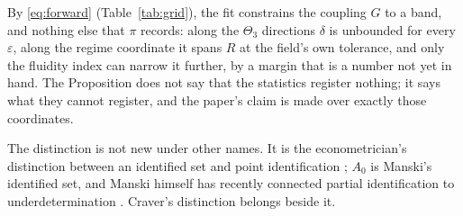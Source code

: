\documentclass[11pt]{article}
\begin{document}
By \eqref{eq:forward} (Table~\ref{tab:grid}), the fit constrains the coupling $G$ to a band, and nothing else that $\pi$ records: along the $\Theta_3$ directions $\delta$ is unbounded for every $\varepsilon$, along the regime coordinate it spans $R$ at the field's own tolerance, and only the fluidity index can narrow it further, by a margin that is a number not yet in hand. The Proposition does not say that the statistics register nothing; it says what they cannot register, and the paper's claim is made over exactly those coordinates.

The distinction is not new under other names. It is the econometrician's distinction between an identified set and point identification \parencite{koopmans1950,manski2003}; $A_0$ is Manski's identified set, and Manski himself has recently connected partial identification to underdetermination \parencite{manski2026}. Craver's distinction belongs beside it.
\end{document}

